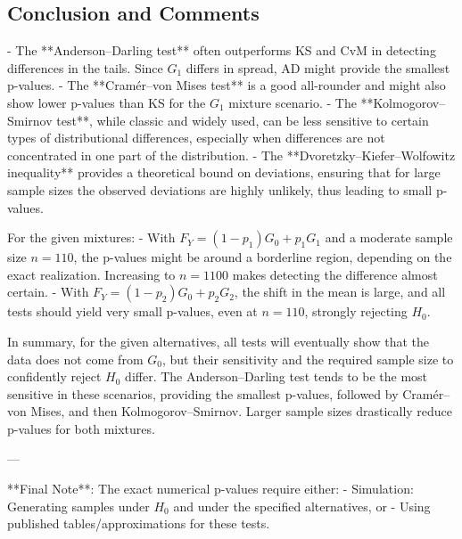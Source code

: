 \documentclass{article}
\begin{document}
\subsection{Conclusion and Comments}

- The **Anderson–Darling test** often outperforms KS and CvM in detecting differences in the tails. Since \(G_1\) differs in spread, AD might provide the smallest p-values.
- The **Cramér–von Mises test** is a good all-rounder and might also show lower p-values than KS for the \(G_1\) mixture scenario.
- The **Kolmogorov–Smirnov test**, while classic and widely used, can be less sensitive to certain types of distributional differences, especially when differences are not concentrated in one part of the distribution.
- The **Dvoretzky–Kiefer–Wolfowitz inequality** provides a theoretical bound on deviations, ensuring that for large sample sizes the observed deviations are highly unlikely, thus leading to small p-values.

For the given mixtures:
- With \(F_Y = (1-p_1)G_0 + p_1 G_1\) and a moderate sample size \(n=110\), the p-values might be around a borderline region, depending on the exact realization. Increasing to \(n=1100\) makes detecting the difference almost certain.
- With \(F_Y = (1-p_2)G_0 + p_2 G_2\), the shift in the mean is large, and all tests should yield very small p-values, even at \(n=110\), strongly rejecting \(H_0\).

In summary, for the given alternatives, all tests will eventually show that the data does not come from \(G_0\), but their sensitivity and the required sample size to confidently reject \(H_0\) differ. The Anderson–Darling test tends to be the most sensitive in these scenarios, providing the smallest p-values, followed by Cramér–von Mises, and then Kolmogorov–Smirnov. Larger sample sizes drastically reduce p-values for both mixtures.

---

**Final Note**: The exact numerical p-values require either:
- Simulation: Generating samples under \(H_0\) and under the specified alternatives, or
- Using published tables/approximations for these tests.
\end{document}
